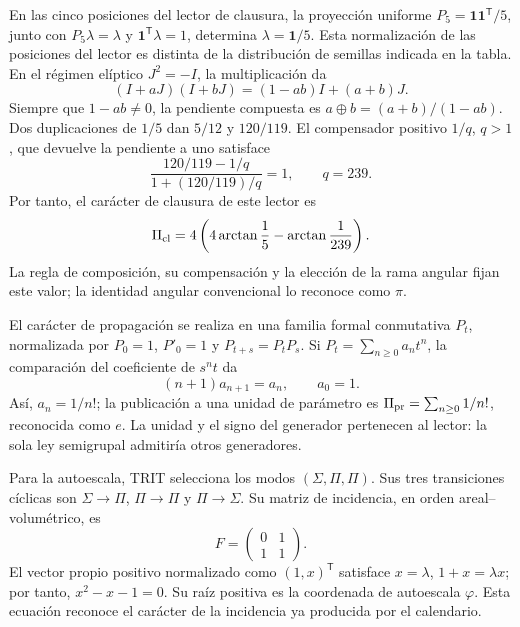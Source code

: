 En las cinco posiciones del lector de clausura, la proyección uniforme
\(P_5=\mathbf1\mathbf1^{\mathsf T}/5\), junto con
\(P_5\lambda=\lambda\) y \(\mathbf1^{\mathsf T}\lambda=1\), determina
\(\lambda=\mathbf1/5\). Esta normalización de las posiciones del lector
es distinta de la distribución de semillas indicada en la tabla.
En el régimen elíptico \(J^2=-I\), la multiplicación da
\[
(I+aJ)(I+bJ)=(1-ab)I+(a+b)J.
\]
Siempre que \(1-ab\ne0\), la pendiente compuesta es
\(a\oplus b=(a+b)/(1-ab)\). Dos duplicaciones de \(1/5\) dan
\(5/12\) y \(120/119\). El compensador positivo \(1/q\), \(q>1\),
que devuelve la pendiente a uno satisface
\[
\frac{120/119-1/q}{1+(120/119)/q}=1,
\qquad q=239.
\]
Por tanto, el carácter de clausura de este lector es
\begin{equation}
 \Pi_{\rm cl}=4\left(4\arctan\frac15-\arctan\frac1{239}\right).
 \label{vi:dep:lector-clausura}
\end{equation}
La regla de composición, su compensación y la elección de la rama angular
fijan este valor; la identidad angular convencional lo reconoce como \(\pi\).

El carácter de propagación se realiza en una familia formal conmutativa
\(P_t\), normalizada por \(P_0=1\), \(P'_0=1\) y
\(P_{t+s}=P_tP_s\). Si \(P_t=\sum_{n\ge0}a_nt^n\), la comparación
del coeficiente de \(s^nt\) da
\[
 (n+1)a_{n+1}=a_n,\qquad a_0=1.
\]
Así, \(a_n=1/n!\); la publicación a una unidad de parámetro es
\(\Pi_{\rm pr}=\sum_{n\ge0}1/n!\), reconocida como \(e\).
La unidad y el signo del generador pertenecen al lector: la sola ley
semigrupal admitiría otros generadores.

Para la autoescala, TRIT selecciona los modos
\((\Sigma,\Pi,\Pi)\). Sus tres transiciones cíclicas son
\(\Sigma\to\Pi\), \(\Pi\to\Pi\) y \(\Pi\to\Sigma\). Su matriz
de incidencia, en orden areal--volumétrico, es
\begin{equation}
 F=\begin{pmatrix}0&1\\1&1\end{pmatrix}.
 \label{vi:dep:incidencia-hojas}
\end{equation}
El vector propio positivo normalizado como \((1,x)^{\mathsf T}\)
satisface \(x=\lambda\), \(1+x=\lambda x\); por tanto,
\(x^2-x-1=0\). Su raíz positiva es la coordenada de autoescala
\(\varphi\). Esta ecuación reconoce el carácter de la incidencia ya
producida por el calendario.

